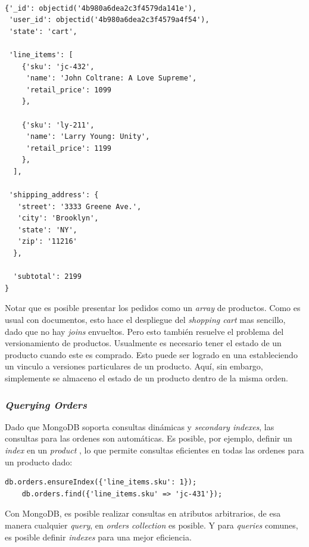 \medskip
\begin{lstlisting}[caption= Estructura de una orden.]

{'_id': objectid('4b980a6dea2c3f4579da141e'),
 'user_id': objectid('4b980a6dea2c3f4579a4f54'),
 'state': 'cart',

 'line_items': [
    {'sku': 'jc-432',
     'name': 'John Coltrane: A Love Supreme',
     'retail_price': 1099
    },

    {'sku': 'ly-211',
     'name': 'Larry Young: Unity',
     'retail_price': 1199
    },
  ],

 'shipping_address': {
   'street': '3333 Greene Ave.',
   'city': 'Brooklyn',
   'state': 'NY',
   'zip': '11216'
  },

  'subtotal': 2199
}
\end{lstlisting}

Notar que es posible presentar los pedidos como un \textit{array} de productos. Como es usual con documentos, esto hace el despliegue del \textit{shopping cart} mas sencillo, dado que no hay \textit{joins} envueltos. Pero esto también resuelve el problema del versionamiento de productos. Usualmente es necesario tener el estado de un producto cuando este es comprado. Esto puede ser logrado en una  estableciendo un vinculo a versiones particulares de un producto. Aquí, sin embargo, simplemente se almaceno el estado de un producto dentro de la misma orden.

\subsubsection{\textit{Querying Orders}}

Dado que MongoDB soporta consultas dinámicas y \textit{secondary indexes}, las consultas para las ordenes son automáticas. Es posible, por ejemplo, definir un \textit{index} en un \textit{product }, lo que permite consultas eficientes en todas las ordenes para un producto dado:

\medskip
\begin{lstlisting}[caption= Consulta eficiente con \textit{secondary indexes}.]
	db.orders.ensureIndex({'line_items.sku': 1});
	db.orders.find({'line_items.sku' => 'jc-431'});
\end{lstlisting}

Con MongoDB, es posible realizar consultas en atributos arbitrarios, de esa manera cualquier \textit{query}, en \textit{orders collection} es posible. Y para \textit{queries} comunes, es posible definir \textit{indexes} para una mejor eficiencia.

